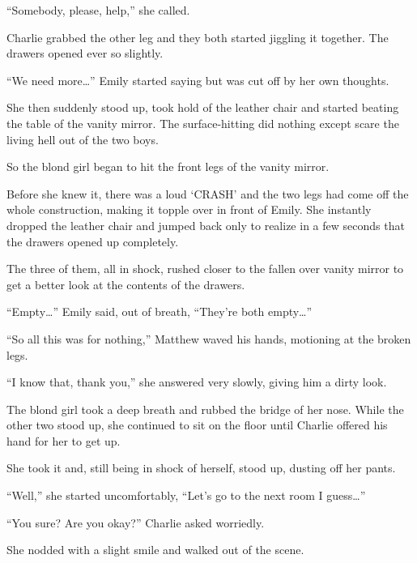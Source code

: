 “Somebody, please, help,” she called.

Charlie grabbed the other leg and they both started jiggling it together. The drawers opened ever so slightly.

“We need more…” Emily started saying but was cut off by her own thoughts.

She then suddenly stood up, took hold of the leather chair and started beating the table of the vanity mirror. The surface-hitting did nothing except scare the living hell out of the two boys.

So the blond girl began to hit the front legs of the vanity mirror.

Before she knew it, there was a loud ‘CRASH’ and the two legs had come off the whole construction, making it topple over in front of Emily. She instantly dropped the leather chair and jumped back only to realize in a few seconds that the drawers opened up completely.

The three of them, all in shock, rushed closer to the fallen over vanity mirror to get a better look at the contents of the drawers.

“Empty…” Emily said, out of breath, “They’re both empty…”

“So all this was for nothing,” Matthew waved his hands, motioning at the broken legs.

“I know that, thank you,” she answered very slowly, giving him a dirty look.

The blond girl took a deep breath and rubbed the bridge of her nose. While the other two stood up, she continued to sit on the floor until Charlie offered his hand for her to get up.

She took it and, still being in shock of herself, stood up, dusting off her pants.

“Well,” she started uncomfortably, “Let’s go to the next room I guess…”

“You sure? Are you okay?” Charlie asked worriedly.

She nodded with a slight smile and walked out of the scene.